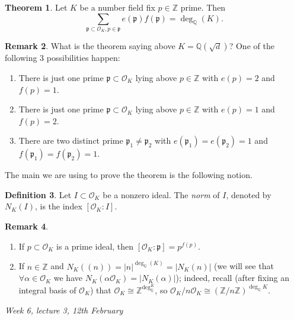 \documentclass{article}
\newcommand{\Z}{\mathbb{Z}}
\newcommand{\Q}{\mathbb{Q}}
\newcommand{\ri}{\mathcal{O}}
\newcommand{\ip}{\mathfrak{p}}
\theoremstyle{definition}
\newtheorem{defn}{Definition}[subsection]
\newtheorem{thm}[defn]{Theorem}
\newtheorem{remark}[defn]{Remark}
\begin{document}
\begin{thm}
\label{thm:ramineanddeg}
Let $K$ be a number field fix $p\in\Z$ prime. Then
\[
\sum_{\ip\subset\ri_K,p\in\ip} e(\ip)f(\ip)=\deg_\Q(K).
\]
\end{thm}
\begin{remark}
\label{remark:ramineinquadext}
What is the theorem saying above $K=\Q\left(\sqrt d\right)$? One of the following 3 possibilities happen:
\begin{enumerate}
\item There is just one prime $\ip\subset\ri_K$ lying above $p\in\Z$ with $e(p)=2$ and $f(p)=1$.
\item There is just one prime $\ip\subset\ri_K$ lying above $p\in\Z$ with $e(p)=1$ and $f(p)=2$. 
\item There are two distinct prime $\ip_1\neq\ip_2$ with $e(\ip_1)=e(\ip_2)=1$ and $f(\ip_1)=f(\ip_2)=1$.
\end{enumerate}
\end{remark}

The main we are using to prove the theorem is the following notion.

\begin{defn}
Let $I\subset\ri_K$ be a nonzero ideal. The \textit{norm} of $I$, denoted by $N_K(I)$, is the index $[\ri_K:I]$.
\end{defn}

\begin{remark}
\label{remark:normofideal}
\begin{enumerate}
\item If $p\subset\ri_K$ is a prime ideal, then $[\ri_K:\ip]=p^{f(p)}$.
\item If $n\in\Z$ and $N_K((n))=|n|^{\deg_\Q(K)}=|N_K(n)|$ (we will see that $\forall\alpha\in\ri_K$ we have $N_K(\alpha\ri_K)=|N_K(\alpha)|$); indeed, recall (after fixing an integral basis of $\ri_K$) that $\ri_K\cong\Z^{\deg_\Q^K}$, so $\ri_K/n\ri_K\cong(\Z/n\Z)^{\deg_\Q K}$.
\end{enumerate}
\end{remark}

\begin{flushright}
\textit{Week 6, lecture 3, 12th February}
\end{flushright}
\end{document}
